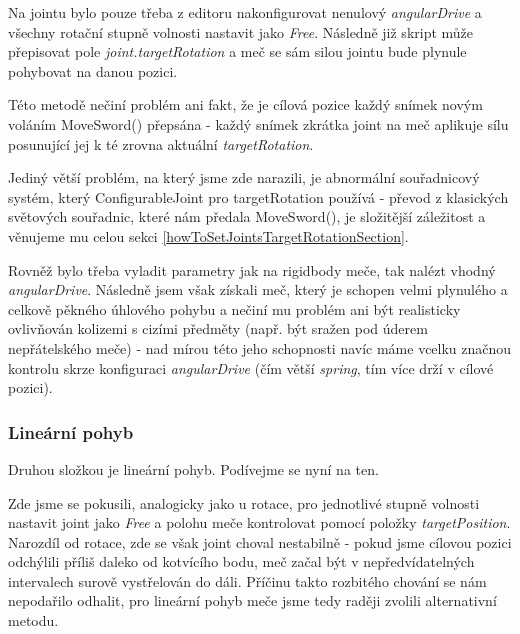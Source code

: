 Na jointu bylo pouze třeba z editoru nakonfigurovat nenulový \textit{angularDrive} a všechny rotační stupně volnosti nastavit jako \textit{Free}. Následně již skript může přepisovat pole \textit{joint.targetRotation} a meč se sám silou jointu bude plynule pohybovat na danou pozici.

Této metodě nečiní problém ani fakt, že je cílová pozice každý snímek novým voláním MoveSword() přepsána - každý snímek zkrátka joint na meč aplikuje sílu posunující jej k té zrovna aktuální \textit{targetRotation}. 

Jediný větší problém, na který jsme zde narazili, je abnormální souřadnicový systém, který ConfigurableJoint pro targetRotation používá - převod z klasických světových souřadnic, které nám předala MoveSword(), je složitější záležitost a věnujeme mu celou sekci \ref{howToSetJointsTargetRotationSection}. 

Rovněž bylo třeba vyladit parametry jak na rigidbody meče, tak nalézt vhodný \textit{angularDrive}. Následně jsem však získali meč, který je schopen velmi plynulého a celkově pěkného úhlového pohybu a nečiní mu problém ani být realisticky ovlivňován kolizemi s cizími předměty (např. být sražen pod úderem nepřátelského meče) - nad mírou této jeho schopnosti navíc máme vcelku značnou kontrolu skrze konfiguraci \textit{angularDrive} (čím větší \textit{spring}, tím více drží v cílové pozici).

\subsubsection*{Lineární pohyb}

Druhou složkou je lineární pohyb. Podívejme se nyní na ten.

Zde jsme se pokusili, analogicky jako u rotace, pro jednotlivé stupně volnosti nastavit joint jako \textit{Free} a polohu meče kontrolovat pomocí položky \textit{targetPosition}. Narozdíl od rotace, zde se však joint choval nestabilně - pokud jsme cílovou pozici odchýlili příliš daleko od kotvícího bodu, meč začal být v nepředvídatelných intervalech surově vystřelován do dáli. Příčinu takto rozbitého chování se nám nepodařilo odhalit, pro lineární pohyb meče jsme tedy raději zvolili alternativní metodu. 


